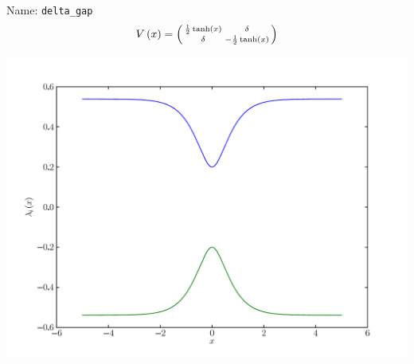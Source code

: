 \documentclass[a4paper,10pt]{report}
\begin{document}
\begin{minipage}{0.5\linewidth}
  Name:    \texttt{delta\_gap}
  \begin{equation*}
    V\left( x \right) = \left(\begin{smallmatrix}\frac{1}{2} \operatorname{tanh}\left(x\right) & \delta\\\delta & - \frac{1}{2} \operatorname{tanh}\left(x\right)\end{smallmatrix}\right)
  \end{equation*}
\end{minipage}
\begin{minipage}{0.5\linewidth}
  \begin{center}
    \includegraphics[scale=0.25]{./fig/delta_gap.pdf}
  \end{center}
\end{minipage}
\end{document}

